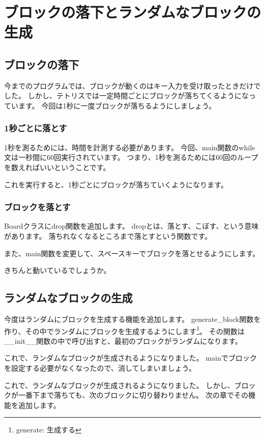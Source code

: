 \chapter{ブロックの落下とランダムなブロックの生成}
\section{ブロックの落下}
今までのプログラムでは、ブロックが動くのはキー入力を受け取ったときだけでした。
しかし、テトリスでは一定時間ごとにブロックが落ちてくるようになっています。
今回は1秒に一度ブロックが落ちるようにしましょう。
\subsection{1秒ごとに落とす}
1秒を測るためには、時間を計測する必要があります。
今回、main関数のwhile文は一秒間に60回実行されています。
つまり、1秒を測るためには60回のループを数えればいいということです。

これを実行すると、1秒ごとにブロックが落ちていくようになります。

\subsection{ブロックを落とす}
Boardクラスにdrop関数を追加します。
dropとは、落とす、こぼす、という意味があります。
落ちれなくなるところまで落とすという関数です。

また、main関数を変更して、スペースキーでブロックを落とせるようにします。

きちんと動いているでしょうか。

\section{ランダムなブロックの生成}
今度はランダムにブロックを生成する機能を追加します。
generate\_block関数を作り、その中でランダムにブロックを生成するようにします\footnote{generate: 生成する}。
その関数は\_\_init\_\_関数の中で呼び出すと、最初のブロックがランダムになります。

これで、ランダムなブロックが生成されるようになりました。
mainでブロックを設定する必要がなくなったので、消してしまいましょう。

これで、ランダムなブロックが生成されるようになりました。
しかし、ブロックが一番下まで落ちても、次のブロックに切り替わりません。
次の章でその機能を追加します。